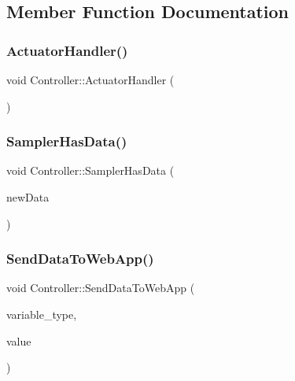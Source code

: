 \subsection{Member Function Documentation}
\mbox{\label{classController_acd0145853d19eaf3ef9d15f6203ace69}} 
\subsubsection{\texorpdfstring{Actuator\+Handler()}{ActuatorHandler()}}
{\footnotesize\ttfamily void Controller\+::\+Actuator\+Handler (\begin{DoxyParamCaption}{ }\end{DoxyParamCaption})\hspace{0.3cm}{\ttfamily [private]}}

\mbox{\label{classController_a4b765eaaf8f72e964118967f86c265e2}} 
\subsubsection{\texorpdfstring{Sampler\+Has\+Data()}{SamplerHasData()}}
{\footnotesize\ttfamily void Controller\+::\+Sampler\+Has\+Data (\begin{DoxyParamCaption}\item[{\hyperlink{structEnvironmentData}{Environment\+Data}}]{new\+Data }\end{DoxyParamCaption})}

\mbox{\label{classController_a9d59ef3807f630a52c964a899a7235dd}} 
\subsubsection{\texorpdfstring{Send\+Data\+To\+Web\+App()}{SendDataToWebApp()}}
{\footnotesize\ttfamily void Controller\+::\+Send\+Data\+To\+Web\+App (\begin{DoxyParamCaption}\item[{std\+::string}]{variable\+\_\+type,  }\item[{float}]{value }\end{DoxyParamCaption})\hspace{0.3cm}{\ttfamily [private]}}

